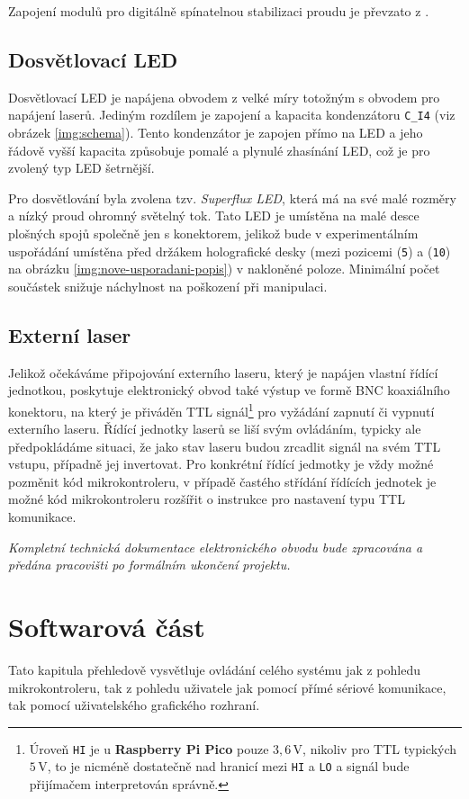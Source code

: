 \documentclass[twoside,project]{../MFFPrace}
\begin{document}
Zapojení modulů pro digitálně spínatelnou stabilizaci proudu je převzato z \cite{system}.

\section{Dosvětlovací LED}
Dosvětlovací LED je napájena obvodem z velké míry totožným s obvodem pro napájení laserů. Jediným rozdílem je zapojení a kapacita kondenzátoru \texttt{C\_I4} (viz obrázek \ref{img:schema}). Tento kondenzátor je zapojen přímo na LED a jeho řádově vyšší kapacita způsobuje pomalé a plynulé zhasínání LED, což je pro zvolený typ LED šetrnější.

Pro dosvětlování byla zvolena tzv. \textit{Superflux LED}, která má na své malé rozměry a nízký proud ohromný světelný tok. Tato LED je umístěna na malé desce plošných spojů společně jen s konektorem, jelikož bude v experimentálním uspořádání umístěna před držákem holografické desky (mezi pozicemi (\texttt{5}) a (\texttt{10}) na obrázku \ref{img:nove-usporadani-popis}) v nakloněné poloze. Minimální počet součástek snižuje náchylnost na poškození při manipulaci.

\section{Externí laser}
Jelikož očekáváme připojování externího laseru, který je napájen vlastní řídící jednotkou, poskytuje elektronický obvod také výstup ve formě BNC koaxiálního konektoru, na který je přiváděn TTL signál\footnote{Úroveň \texttt{HI} je u \textbf{Raspberry Pi Pico} pouze $3{,}6\,\text{V}$, nikoliv pro TTL typických $5\,\text{V}$, to je nicméně dostatečně nad hranicí mezi \texttt{HI} a \texttt{LO} a signál bude přijímačem interpretován správně.} pro vyžádání zapnutí či vypnutí externího laseru. Řídící jednotky laserů se liší svým ovládáním, typicky ale předpokládáme situaci, že jako stav laseru budou zrcadlit signál na svém TTL vstupu, případně jej invertovat. Pro konkrétní řídící jedmotky je vždy možné pozměnit kód mikrokontroleru, v případě častého střídání řídících jednotek je možné kód mikrokontroleru rozšířit o instrukce pro nastavení typu TTL komunikace.


\vfill
\noindent
\textit{Kompletní technická dokumentace elektronického obvodu bude zpracována a předána pracovišti po formálním ukončení projektu.}
\chapter{Softwarová část\label{cpt:software}}
\begin{center}
    Tato kapitula přehledově vysvětluje ovládání celého systému jak z pohledu mikrokontroleru, tak z pohledu uživatele jak pomocí přímé sériové komunikace, tak pomocí uživatelského grafického rozhraní.
\end{center}
\end{document}
